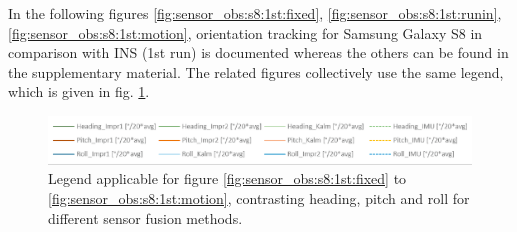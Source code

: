 \documentclass[review]{elsarticle}
\begin{document}
In the following figures \ref{fig:sensor_obs:s8:1st:fixed}, \ref{fig:sensor_obs:s8:1st:runin}, \ref{fig:sensor_obs:s8:1st:motion}, orientation tracking for Samsung Galaxy S8 in comparison with \gls{INS} (1st run) is documented whereas the others can be found in the supplementary material. The related figures collectively use the same legend, which is given in fig. \ref{fig:sensor_obs:s8:1st:legend}.

\begin{figure}[htbp!]
\begin{center}
	\centering
	\includegraphics[keepaspectratio, width=0.9\columnwidth]{graphics/Sensor_Galaxy_run1/sensor_diagramms_galaxys8_legend_trim}
	\caption{Legend applicable for figure \ref{fig:sensor_obs:s8:1st:fixed} to \ref{fig:sensor_obs:s8:1st:motion}, contrasting \textcolor{heading_green}{heading}, \textcolor{pitch_orange}{pitch} and \textcolor{roll_blue}{roll} for different sensor fusion methods.}
	\label{fig:sensor_obs:s8:1st:legend}
\end{center}
\end{figure}
\end{document}
